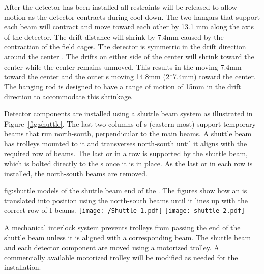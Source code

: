 After the detector has been installed all restraints will be released to allow motion as the detector contracts during cool down.  The two hangars that support each  beam will contract and move toward each other by 13.1 mm along the axis of the detector.  
The drift distance will shrink by 7.4mm caused by the contraction of the field cages.  The detector is symmetric in the drift direction around the center .  The drifts on either side of the center  will  shrink toward the center while the center  remains unmoved.  This results in the  moving 7.4mm toward the center and the outer s moving 14.8mm (2*7.4mm) toward the center.  The hanging rod is designed to have a range of motion of 15mm in the drift direction to accommodate this shrinkage.




Detector components are installed using a shuttle beam system as
illustrated in Figure~\ref{fig:shuttle}.  
The last two columns of
\fdth{}s (eastern-most) support temporary beams that run
north-south, perpendicular to the main  beams.  
A shuttle beam has trolleys mounted to it and transverses 
north-south until it aligns with the required row of  beams.  
The last  or  in a row is supported by the shuttle beam, which is bolted directly to the \fdth{}s once it is in place.  
As the last  or  in each row is installed, the north-south beams are removed.

\begin{dunefigure}{fig:shuttle}
  {\threed models of the shuttle beam end of the . The figures show how an 
is translated into position using the north-south beams until it lines up with the correct
row of I-beams.}
\texttt{[image: /Shuttle-1.pdf]}
 \texttt{[image: shuttle-2.pdf]}
\end{dunefigure}

A mechanical interlock system  prevents trolleys
from passing the end of the shuttle beam unless it is aligned with a
corresponding  beam.  The shuttle beam and each detector component are
moved using a motorized trolley.  A commercially available motorized
trolley will be modified as needed for the
installation. 




